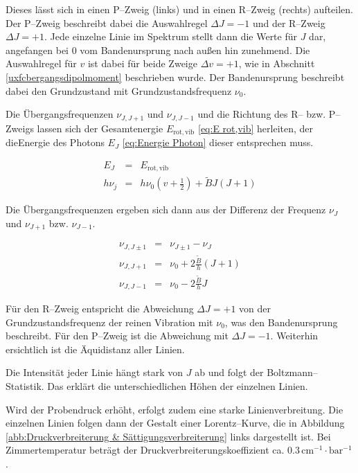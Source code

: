 \documentclass[12pt,a4paper]{scrartcl}
\numberwithin{equation}{section} %
\begin{document}
	Dieses lässt sich in einen P--Zweig (links) und in einen R--Zweig (rechts) aufteilen. Der P--Zweig beschreibt dabei die Auswahlregel $\Delta J = -1$ und der R--Zweig $\Delta J = +1$. Jede einzelne Linie im Spektrum stellt dann die Werte für $J$ dar, angefangen bei $0$ vom Bandenursprung nach außen hin zunehmend. Die Auswahlregel für $v$ ist dabei für beide Zweige $\Delta v = +1$, wie in Abschnitt \ref{uxfcbergangsdipolmoment} beschrieben wurde. Der Bandenursprung beschreibt dabei den Grundzustand mit Grundzustandsfrequenz $\nu_0$.
	
	Die Übergangsfrequenzen $\nu_{J, J+1}$ und $\nu_{J, J-1}$ und die Richtung des R-- bzw. P--Zweigs lassen sich der Gesamtenergie $E_\mathrm{rot,vib}$ \eqref{eq:E rot,vib} herleiten, der dieEnergie des Photons $E_J$ \eqref{eq:Energie Photon} dieser entsprechen muss.
	
	\begin{eqnarray}
		E_J &=& E_\mathrm{rot,vib} \\
		h \nu_j &=& h \nu_0 \left(v + \frac{1}{2}\right) + \tilde{B} J (J + 1)
	\end{eqnarray}
	
	\noindent
	Die Übergangsfrequenzen ergeben sich dann aus der Differenz der Frequenz $\nu_J$ und $\nu_{J+1}$ bzw. $\nu_{J-1}$.
	
	\begin{eqnarray}
		\nu_{J, J\pm1} &=& \nu_{J\pm1} - \nu_J \\
		\nu_{J, J+1} &=& \nu_0 + 2 \frac{\tilde{B}}{h} (J+1) \\
		\nu_{J, J-1} &=& \nu_0 - 2 \frac{\tilde{B}}{h} J
	\end{eqnarray}
	
	\noindent
	Für den R--Zweig entspricht die Abweichung $\Delta J = +1$ von der Grundzustandsfrequenz der reinen Vibration mit $\nu_0$, was den Bandenursprung beschreibt. Für den P--Zweig ist die Abweichung mit $\Delta J = -1$. Weiterhin ersichtlich ist die Äquidistanz aller Linien.
	
	Die Intensität jeder Linie hängt stark von $J$ ab und folgt der Boltzmann--Statistik. Das erklärt die unterschiedlichen Höhen der einzelnen Linien.
	
	Wird der Probendruck erhöht, erfolgt zudem eine starke Linienverbreitung. Die einzelnen Linien folgen dann der Gestalt einer Lorentz--Kurve, die in Abbildung \ref{abb:Druckverbreiterung & Sättigungsverbreiterung} links dargestellt ist. Bei Zimmertemperatur beträgt der Druckverbreiterungskoeffizient ca. $0.3 \mathrm{\, cm^{-1}\cdot bar^{-1}}$ \cite{UzK}.
	
\end{document}
